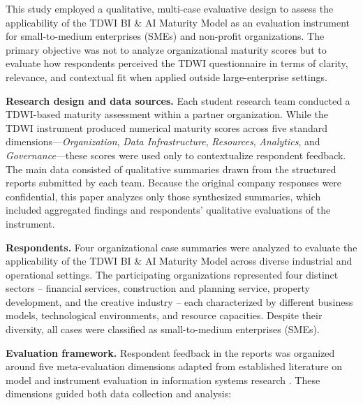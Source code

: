 \documentclass[conference]{IEEEtran}
\begin{document}
This study employed a qualitative, multi-case evaluative design to assess the applicability of the TDWI BI \& AI Maturity Model as an evaluation instrument for small-to-medium enterprises (SMEs) and non-profit organizations. The primary objective was not to analyze organizational maturity scores but to evaluate how respondents perceived the TDWI questionnaire in terms of clarity, relevance, and contextual fit when applied outside large-enterprise settings.

\textbf{Research design and data sources.}  
Each student research team conducted a TDWI-based maturity assessment within a partner organization. While the TDWI instrument produced numerical maturity scores across five standard dimensions—\textit{Organization}, \textit{Data Infrastructure}, \textit{Resources}, \textit{Analytics}, and \textit{Governance}—these scores were used only to contextualize respondent feedback. The main data consisted of qualitative summaries drawn from the structured reports submitted by each team. Because the original company responses were confidential, this paper analyzes only those synthesized summaries, which included aggregated findings and respondents’ qualitative evaluations of the instrument.

\textbf{Respondents.} Four organizational case summaries were analyzed to evaluate the applicability of the TDWI BI \& AI Maturity Model across diverse industrial and operational settings. The participating organizations represented four distinct sectors -- financial services, construction and planning service, property development, and the creative industry -- each characterized by different business models, technological environments, and resource capacities. Despite their diversity, all cases were classified as small-to-medium enterprises (SMEs).

\textbf{Evaluation framework.}  
Respondent feedback in the reports was organized around five meta-evaluation dimensions adapted from established literature on model and instrument evaluation in information systems research \cite{becker2009developing, rosemann2008applicability, boudreau2005contextualization, arnott2015managing, hevner2004design, venable2016design}. These dimensions guided both data collection and analysis:
\end{document}
